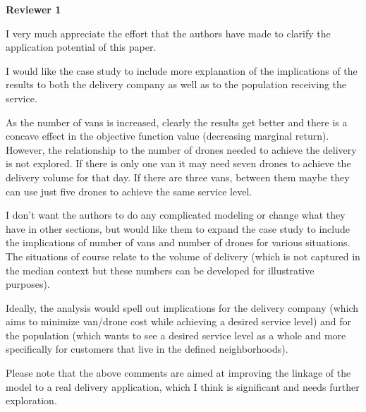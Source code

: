 \documentclass{article}
\newenvironment{reviewer}{\setcounter{pointcounter}{1}}{}
\newcommand{\point}{\text{{\selectfont \thepointcounter} \stepcounter{pointcounter}}}
\begin{document}
	\begin{reviewer}
		
		\begin{tcolorbox}[breakable,enhanced,coltitle=black,colback=red!75!black,colframe=red!75!black,borderline={1pt}{0pt}{black},boxrule=0pt]
			\textbf{Reviewer 1}
		\end{tcolorbox}
		
		\begin{itshape}
			I very much appreciate the effort that the authors have made to clarify the application potential of this paper.

			I would like the case study to include more explanation of the implications of the results to both the delivery company as well as to the population receiving the service.

			As the number of vans is increased, clearly the results get better and there is a concave effect in the objective function value (decreasing marginal return). However, the relationship to the number of drones needed to achieve the delivery is not explored. If there is only one van it may need seven drones to achieve the delivery volume for that day. If there are three vans, between them maybe they can use just five drones to achieve the same service level.

			I don't want the authors to do any complicated modeling or change what they have in other sections, but would like them to expand the case study to include the implications of number of vans and number of drones for various situations. The situations of course relate to the volume of delivery (which is not captured in the median context but these numbers can be developed for illustrative purposes).

			Ideally, the analysis would spell out implications for the delivery company (which aims to minimize van/drone cost while achieving a desired service level) and for the population (which wants to see a desired service level as a whole and more specifically for customers that live in the defined neighborhoods).

			Please note that the above comments are aimed at improving the linkage of the model to a real delivery application, which I think is significant and needs further exploration.

		\end{itshape}
		
		\begin{tcolorbox}[breakable,enhanced,coltitle=black,colback=red!5!white,colframe=red!75!black,title=\textbf{Answer R1.\point},borderline={1pt}{0pt}{black},boxrule=0pt]

		\end{tcolorbox}
		
	\end{reviewer}
	
\end{document}
